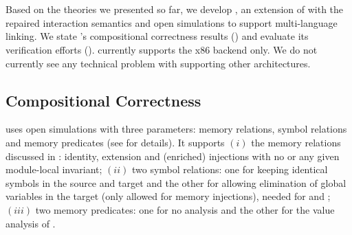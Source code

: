 \section{\ccm{}}\label{sec:results}


Based on the theories we presented so far, we develop \ccm{}, an extension of \cc{} with the
repaired interaction semantics and open simulations to support multi-language linking.  We state
\ccm{}'s compositional correctness results () and evaluate its
verification efforts ().  \ccm{} currently supports the x86 backend only.
We do not currently see any technical problem with supporting other architectures.



\subsection{Compositional Correctness}
\label{sec:results:compiler}

\ccm{} uses open simulations with three parameters:
memory relations, symbol relations and memory predicates
(see  for details).
It supports $(i)$ the memory relations discussed in :
identity, extension and (enriched) injections with no or any given module-local invariant;
$(ii)$ two symbol relations: one for keeping identical symbols in the source and target
and the other for allowing elimination of global variables in the target (only allowed for memory injections), needed for  and ;
$(iii)$ two memory predicates: one for no analysis and the other for the value analysis of \cc{}.

